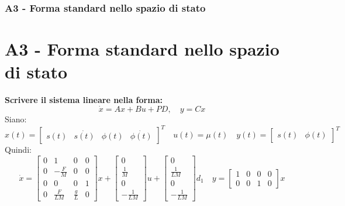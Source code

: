 \documentclass{beamer}
\begin{document}
\begin{frame}
	\frametitle{A3 - Forma standard nello spazio di stato}%
	\section{A3 - Forma standard nello spazio di stato}%
	\textbf{Scrivere il sistema lineare nella forma:\begin{equation*}
			\dot{x}=Ax+Bu+PD,\quad y=Cx
		\end{equation*}}
	Siano:\begin{equation*}
		x(t)=\begin{bmatrix}
			s(t) & \dot{s(t)} & \phi(t) & \dot{\phi(t)}
		\end{bmatrix}^{T}\quad u(t)=\mu(t)\quad y(t)=\begin{bmatrix}
			s(t) & \phi(t)
		\end{bmatrix}^{T}
	\end{equation*}
	Quindi:\small
	\begin{equation*}
		\dot{x}=\begin{bmatrix}
			0 & 1            & 0           & 0 \\
			0 & -\frac{F}{M} & 0           & 0 \\
			0 & 0            & 0           & 1 \\
			0 & \frac{F}{LM} & \frac{g}{L} & 0
		\end{bmatrix}x+\begin{bmatrix}
			0 \\\frac{1}{M}\\0\\-\frac{1}{LM}
		\end{bmatrix}u+\begin{bmatrix}
			0 \\\frac{1}{LM}\\0\\-\frac{1}{LM}
		\end{bmatrix}d_{1}\quad y=\begin{bmatrix}
			1 & 0 & 0 & 0 \\0&0&1&0
		\end{bmatrix}x
	\end{equation*}
\end{frame}
\end{document}
